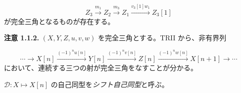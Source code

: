 \[
  Z_3\xrightarrow{m_1}Z_2\xrightarrow{m_3}Z_1
  \xrightarrow{v_3[1]w_1}Z_3[1]
\]
が完全三角となるものが存在する。

\medskip
\noindent\textbf{注意 1.1.2.}\quad
$(X,Y,Z,u,v,w)$ を完全三角とする。TRII から、非有界列

\[
  \cdots\longrightarrow X[n]
  \xrightarrow{(-1)^n u[n]}Y[n]
  \xrightarrow{(-1)^n v[n]}Z[n]
  \xrightarrow{(-1)^n w[n]}X[n+1]
  \longrightarrow\cdots
\]
において、連続する三つの射が完全三角をなすことが分かる。

$\mathcal D\colon X\longmapsto X[n]$ の自己同型を\emph{シフト自己同型}と呼ぶ。
\endgroup
